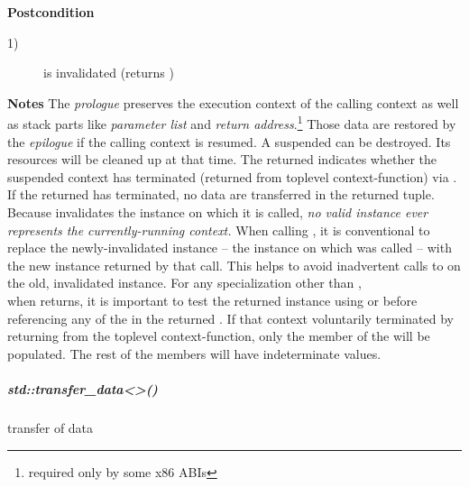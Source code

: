 {\bfseries Postcondition}
\begin{description}
    \item[1)]  is invalidated (\opbool returns )
\end{description}

{\bfseries Notes}
\newline
The \emph{prologue} preserves the execution context of the calling context as
well as stack parts like \emph{parameter list} and \emph{return
address}.\footnote{required only by some x86 ABIs}
Those data are restored by the \emph{epilogue} if the calling context is
resumed.
\newline
A suspended  can be destroyed. Its resources will be
cleaned up at that time.
\newline
The returned  indicates whether the suspended context
has terminated (returned from toplevel context-function) via \opbool. If the
returned  has terminated, no data are transferred in
the returned tuple.
\newline
Because \op invalidates the instance on which it is called, \emph{no
valid \cont instance ever represents the currently-running context.}
\newline
When calling \op, it is conventional to replace the newly-invalidated 
instance -- the instance on which \op was called -- with the new instance
returned by that \op call. This helps to avoid inadvertent calls to \op on the
old, invalidated instance.
\newline
For any \cont specialization other than \contvoid,\\
when \op returns, it is important to test the returned \contargs instance using
\opbool or  before referencing any of the  in the
returned \contargstup. If that context voluntarily terminated by returning
from the toplevel context-function, only the \contargs member of
the  will be populated. The rest of the members will have
indeterminate values.


\subparagraph*{std::transfer\_data<>()}
transfer of data\\
